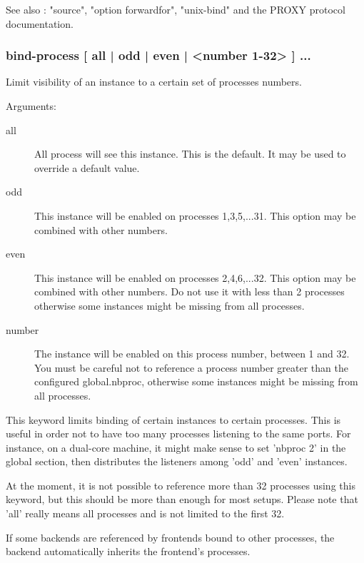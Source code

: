   See also : "source", "option forwardfor", "unix-bind" and the PROXY protocol
             documentation.

\subsubsection[bind-process]{bind-process [ all | odd | even | <number 1-32> ] ...}
  Limit visibility of an instance to a certain set of processes numbers.
  
                                 
  Arguments:
  \begin{description}
  \item[all]   All process will see this instance. This is the default. It
                  may be used to override a default value.

  \item[odd]   This instance will be enabled on processes 1,3,5,...31. This
                  option may be combined with other numbers.

  \item[even]  This instance will be enabled on processes 2,4,6,...32. This
                  option may be combined with other numbers. Do not use it
                  with less than 2 processes otherwise some instances might be
                  missing from all processes.

  \item[number] The instance will be enabled on this process number, between
                  1 and 32. You must be careful not to reference a process
                  number greater than the configured global.nbproc, otherwise
                  some instances might be missing from all processes.
  \end{description}

  This keyword limits binding of certain instances to certain processes. This
  is useful in order not to have too many processes listening to the same
  ports. For instance, on a dual-core machine, it might make sense to set
  'nbproc 2' in the global section, then distributes the listeners among 'odd'
  and 'even' instances.

  At the moment, it is not possible to reference more than 32 processes using
  this keyword, but this should be more than enough for most setups. Please
  note that 'all' really means all processes and is not limited to the first
  32.

  If some backends are referenced by frontends bound to other processes, the
  backend automatically inherits the frontend's processes.

